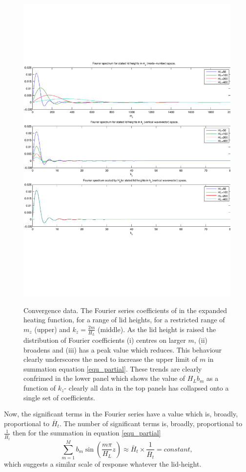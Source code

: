 \documentclass[12pt]{article}
\begin{document}
\begin{figure}[h]
\caption{Convergence data. The Fourier series coefficients of in the expanded heating function, for a range of lid heights, for a restricted range of $m_z$ (upper) and $k_z = \frac{2m}{H_L}$ (middle).
 As the lid height is raised the distribution of Fourier coefficients (i) centres on larger $m$, (ii) broadens and (iii) has a peak value which reduces. This behaviour clearly underscores the need to increase the upper limit of $m$ in summation equation \ref{equ_partial}. These trends are clearly confrimed in the lower panel which shows the value of $H_L b_m$  as a function of $k_z$- clearly all data in the
top panels has collapsed onto a single set of coefficients.  } 
\includegraphics[scale=0.8,angle=0] {fig1.pdf} 
\label{fig_1}
\end{figure}
%
%
%
Now, the significant terms in the Fourier series have a value which is, broadly, proportional to $\bar{H}_t$. The number of significant terms is, broadly, proportional to $\frac{1}{\bar{H}_t}$ then 
for the summation in equation \ref{equ_partial}
%
\begin{equation}
\sum_{m=1}^M  b_m \sin \left( \frac{ m \pi }{ H_L} z \right) \approx \bar{H}_t \times \frac{1}{\bar{H}_t} = constant,
\end{equation}
%
which suggests a similar scale of response whatever the lid-height.
\end{document}
